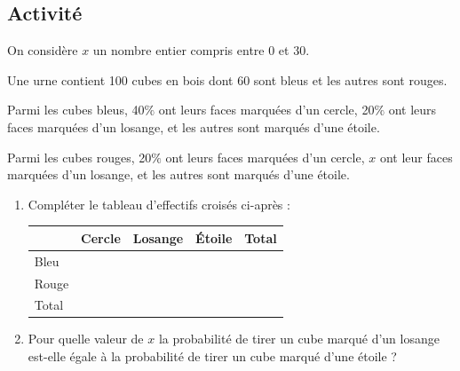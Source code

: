 \documentclass[oneside,12pt]{article}          %
\begin{document}
\subsection*{Activité }
On considère $x$ un nombre entier compris entre $0$ et $30$.

Une urne contient 100 cubes en bois dont 60 sont bleus et les autres sont rouges. 

Parmi les cubes bleus, 40$\%$ ont leurs faces marquées d'un cercle, 20$\%$ ont leurs faces marquées d'un losange, et les autres sont marqués d'une étoile. 

Parmi les cubes rouges, 20$\%$ ont leurs faces marquées d'un cercle, $x$ ont leur faces marquées d'un losange, et les autres sont marqués d'une étoile.
\begin{enumerate}[itemsep = 2pt]
    \item Compléter le tableau d'effectifs croisés ci-après : 
    
			\renewcommand{\arraystretch}{1.75}
			\begin{tabular}{| P{4cm} | P{3cm} | P{3cm} | P{3cm} | P{3cm} |} \hline
				  & Cercle & Losange & Étoile & Total \\ \hline
				Bleu & & & &  \\ \hline
				Rouge & & & & \\ \hline
				Total & & & & \\ \hline
			\end{tabular}
			
	\item Pour quelle valeur de $x$ la probabilité de tirer un cube marqué d'un losange est-elle égale à la probabilité de tirer un cube marqué d'une étoile ?
\end{enumerate}
\end{document}
